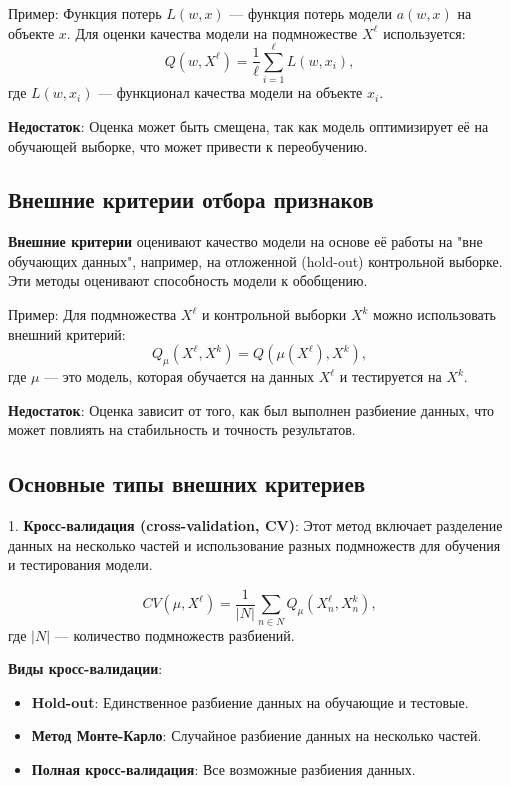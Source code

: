 Пример:
Функция потерь \( L(w, x) \) — функция потерь модели \( a(w, x) \) на объекте \( x \). Для оценки качества модели на подмножестве \( X^\ell \) используется:
\[
Q(w, X^\ell) = \frac{1}{\ell} \sum_{i=1}^{\ell} L(w, x_i),
\]
где \( L(w, x_i) \) — функционал качества модели на объекте \( x_i \).

\textbf{Недостаток}: Оценка может быть смещена, так как модель оптимизирует её на обучающей выборке, что может привести к переобучению.

\subsection{Внешние критерии отбора признаков}

\textbf{Внешние критерии} оценивают качество модели на основе её работы на "вне обучающих данных", например, на отложенной (hold-out) контрольной выборке. Эти методы оценивают способность модели к обобщению.

Пример:
Для подмножества \( X^\ell \) и контрольной выборки \( X^k \) можно использовать внешний критерий:
\[
Q_\mu(X^\ell, X^k) = Q(\mu(X^\ell), X^k),
\]
где \( \mu \) — это модель, которая обучается на данных \( X^\ell \) и тестируется на \( X^k \).

\textbf{Недостаток}: Оценка зависит от того, как был выполнен разбиение данных, что может повлиять на стабильность и точность результатов.
\subsection{Основные типы внешних критериев}

1. \textbf{Кросс-валидация (cross-validation, CV)}: Этот метод включает разделение данных на несколько частей и использование разных подмножеств для обучения и тестирования модели.

   \[
   CV(\mu, X^\ell) = \frac{1}{|N|} \sum_{n \in N} Q_\mu(X^\ell_n, X^k_n),
   \]
   где \( |N| \) — количество подмножеств разбиений.

   \textbf{Виды кросс-валидации}:
   \begin{itemize}
     \item \textbf{Hold-out}: Единственное разбиение данных на обучающие и тестовые.
     \item \textbf{Метод Монте-Карло}: Случайное разбиение данных на несколько частей.
     \item \textbf{Полная кросс-валидация}: Все возможные разбиения данных.
   \end{itemize}

